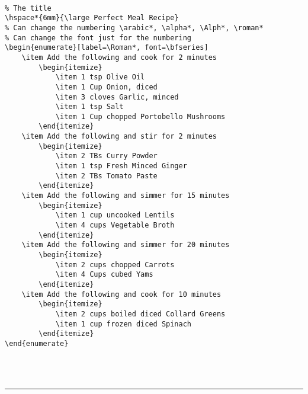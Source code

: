 \documentclass[a4paper,12pt,titlepage]{article}
\begin{document}
\leavevmode
\\
\begin{minipage}{\linewidth}
\begin{lstlisting}
% The title
\hspace*{6mm}{\large Perfect Meal Recipe}
% Can change the numbering \arabic*, \alpha*, \Alph*, \roman*
% Can change the font just for the numbering
\begin{enumerate}[label=\Roman*, font=\bfseries]
	\item Add the following and cook for 2 minutes
		\begin{itemize}
			\item 1 tsp Olive Oil
			\item 1 Cup Onion, diced
			\item 3 cloves Garlic, minced
			\item 1 tsp Salt
			\item 1 Cup chopped Portobello Mushrooms
		\end{itemize}
	\item Add the following and stir for 2 minutes
		\begin{itemize}
			\item 2 TBs Curry Powder
			\item 1 tsp Fresh Minced Ginger
			\item 2 TBs Tomato Paste
		\end{itemize}
	\item Add the following and simmer for 15 minutes
		\begin{itemize}
			\item 1 cup uncooked Lentils
			\item 4 cups Vegetable Broth
		\end{itemize}
	\item Add the following and simmer for 20 minutes
		\begin{itemize}
			\item 2 cups chopped Carrots
			\item 4 Cups cubed Yams
		\end{itemize}
	\item Add the following and cook for 10 minutes
		\begin{itemize}
			\item 2 cups boiled diced Collard Greens
			\item 1 cup frozen diced Spinach
		\end{itemize}
\end{enumerate}
\end{lstlisting}
\end{minipage}
~\\
\\
\rule{\linewidth}{0.1mm}
\end{document}
